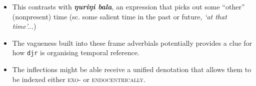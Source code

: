 \documentclass[11pt,dvipsnames]{article}
\begin{document}
\begin{itemize}
\begin{itemize}
	
\end{itemize}




\item This contrasts with \textbf{\textit{ŋuriŋi bala}}, an expression that picks out some ``other'' (nonpresent) time (sc. some salient time in the past or future, \textit{`at that time'...})



\item The vagueness built into these frame adverbials potentially provides a clue for how \texttt{djr} is organising temporal reference.

\item The inflections might be able receive a unified denotation that allows them to be indexed either \textsc{exo-} or \textsc{endocentrically}.

\end{itemize}
\end{document}
